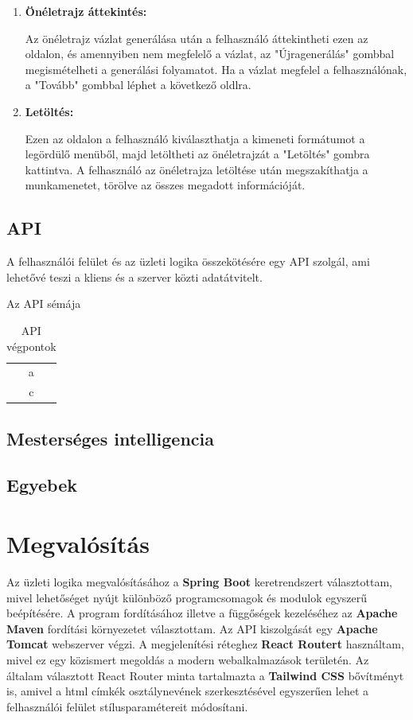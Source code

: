 \begin{enumerate}
    \item \textbf{Önéletrajz áttekintés:}

    Az önéletrajz vázlat generálása után a felhasználó áttekintheti ezen az oldalon, és amennyiben nem megfelelő a vázlat, az "Újragenerálás" gombbal megismételheti a generálási folyamatot. Ha a vázlat megfelel a felhasználónak, a "Tovább" gombbal léphet a következő oldlra.
    
    \item \textbf{Letöltés:}

    Ezen az oldalon a felhasználó kiválaszthatja a kimeneti formátumot a legördülő menüből, majd letöltheti az önéletrajzát a "Letöltés" gombra kattintva. A felhasználó az önéletrajza letöltése után megszakíthatja a munkamenetet, törölve az összes megadott információját.
    
\end{enumerate}

\subsection{API}

A felhasználói felület és az üzleti logika összekötésére egy API szolgál, ami lehetővé teszi a kliens és a szerver közti adatátvitelt.

Az API sémája 

\begin{table}[H]
    \centering
    \begin{tabular}{c|c|c}
         & a \\
         & c \\
    \end{tabular}
    \caption{API végpontok}
    \label{tab:placeholder}
\end{table}


\subsection{Mesterséges intelligencia}

\subsection{Egyebek}

\section{Megvalósítás}

Az üzleti logika megvalósításához a \textbf{Spring Boot} keretrendszert választottam, mivel lehetőséget nyújt különböző programcsomagok és modulok egyszerű beépítésére. A program fordításához illetve a függőségek kezeléséhez az \textbf{Apache Maven} fordítási környezetet választottam. Az API kiszolgását egy \textbf{Apache Tomcat} webszerver végzi. A megjelenítési réteghez \textbf{React Routert} használtam, mivel ez egy közismert megoldás a modern webalkalmazások területén. Az általam választott React Router minta tartalmazta a \textbf{Tailwind CSS} bővítményt is, amivel a html címkék osztálynevének szerkesztésével egyszerűen lehet a felhasználói felület stílusparamétereit módosítani.

